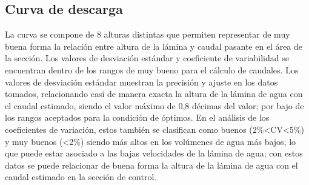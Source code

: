 \documentclass[]{article}
\begin{document}
\subsection{Curva de descarga}\label{curva-de-descarga-40}

La curva se compone de 8 alturas distintas que permiten representar de muy buena forma la relación entre altura de la lámina y caudal pasante en el área de la sección. Los valores de desviación estándar y coeficiente de variabilidad se encuentran dentro de los rangos de muy bueno para el cálculo de caudales. Los valores de desviación estándar muestran la precisión y ajuste en los datos tomados, relacionando casi de manera exacta la altura de la lámina de agua con el caudal estimado, siendo el valor máximo de 0,8 décimas del valor; por bajo de los rangos aceptados para la condición de óptimos. En el análisis de los coeficientes de variación, estos también se clasifican como buenos (2\%<CV<5\%) y muy buenos (<2\%) siendo más altos en los volúmenes de agua más bajos, lo que puede estar asociado a las bajas velocidades de la lámina de agua; con estos datos se puede relacionar de buena forma la altura de la lámina de agua con el caudal estimado en la sección de control.
\end{document}
